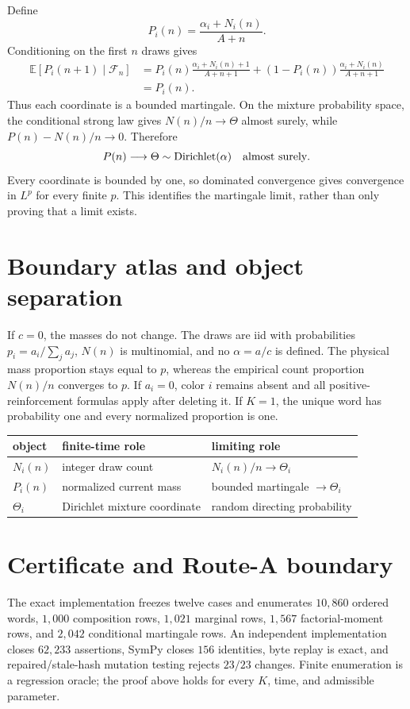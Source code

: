 \documentclass[10pt]{article}
\newcommand{\E}{\mathbb E}
\begin{document}
Define
\[
 P_i(n)=\frac{\alpha_i+N_i(n)}{A+n}.
\]
Conditioning on the first $n$ draws gives
\begin{align*}
 \E[P_i(n+1)\mid\mathcal F_n]
 &=P_i(n)\frac{\alpha_i+N_i(n)+1}{A+n+1}
 +(1-P_i(n))\frac{\alpha_i+N_i(n)}{A+n+1}\\
 &=P_i(n).
\end{align*}
Thus each coordinate is a bounded martingale.  On the mixture probability
space, the conditional strong law gives $N(n)/n\to\Theta$ almost surely,
while $P(n)-N(n)/n\to0$.  Therefore
\[
 P(n)\longrightarrow\Theta\sim\operatorname{Dirichlet}(\alpha)
 \quad\hbox{almost surely}.
\]
Every coordinate is bounded by one, so dominated convergence gives convergence
in $L^p$ for every finite $p$.  This identifies the martingale limit, rather
than only proving that a limit exists.

\section{Boundary atlas and object separation}
If $c=0$, the masses do not change.  The draws are iid with probabilities
$p_i=a_i/\sum_j a_j$, $N(n)$ is multinomial, and no $\alpha=a/c$ is defined.
The physical mass proportion stays equal to $p$, whereas the empirical count
proportion $N(n)/n$ converges to $p$.  If $a_i=0$, color $i$ remains absent and
all positive-reinforcement formulas apply after deleting it.  If $K=1$, the
unique word has probability one and every normalized proportion is one.

\begin{center}
\begin{tabular}{lll}
\toprule
object & finite-time role & limiting role\\
\midrule
$N_i(n)$ & integer draw count & $N_i(n)/n\to\Theta_i$\\
$P_i(n)$ & normalized current mass & bounded martingale $\to\Theta_i$\\
$\Theta_i$ & Dirichlet mixture coordinate & random directing probability\\
\bottomrule
\end{tabular}
\end{center}

\section{Certificate and Route-A boundary}
The exact implementation freezes twelve cases and enumerates $10{,}860$
ordered words, $1{,}000$ composition rows, $1{,}021$ marginal rows,
$1{,}567$ factorial-moment rows, and $2{,}042$ conditional martingale rows.
An independent implementation closes $62{,}233$ assertions, SymPy closes
$156$ identities, byte replay is exact, and repaired/stale-hash mutation
testing rejects $23/23$ changes.  Finite enumeration is a regression oracle;
the proof above holds for every $K$, time, and admissible parameter.
\end{document}
